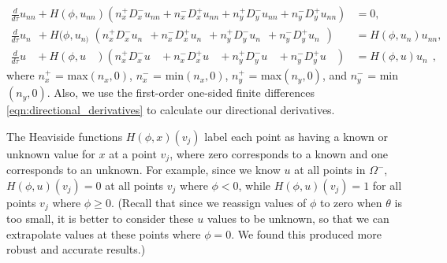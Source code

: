 \documentclass[oneside,12pt,final]{/Applications/TeX/packages/ucthesis-CA2012}
\begin{document}
\begin{mainmatter}
\begin{equation}  
\begin{aligned}
\frac{d}{d \tau}u_{nn} + H(\phi,u_{nn})(n_x^+D_x^-u_{nn} + n_x^-D_x^+u_{nn} + n_y^+D_y^-u_{nn} + n_y^-D_y^+u_{nn}) &= 0,\\
\frac{d}{d \tau}u_{n}\>\> + H(\phi,u_{n)\>\>}(n_x^+D_x^-u_{n}\>\> + n_x^-D_x^+u_{n}\>\> + n_y^+D_y^-u_{n}\>\> + n_y^-D_y^+u_{n}\>\>) &= H(\phi,u_n)u_{nn},\\
\frac{d}{d \tau}u\>\>\>\> + H(\phi,u\>\>\>\>)(n_x^+D_x^-u\>\>\>\> + n_x^-D_x^+u\>\>\>\> + n_y^+D_y^-u\>\>\>\> + n_y^-D_y^+u\>\>\>\>) &= H(\phi,u)u_n\>\>,
\end{aligned}
\end{equation}
where $n_x^+$ = max$(n_x,0)$, $n_x^-$ = min$(n_x,0)$, $n_y^+$ = max$(n_y,0)$, and $n_y^-$ = min$(n_y,0)$. Also, we use the first-order one-sided finite differences \eqref{eqn:directional_derivatives} to calculate our directional derivatives.

The Heaviside functions $H(\phi,x)(v_j)$ label each point as having a known or unknown value for $x$ at a point $v_j$, where zero corresponds to a known and one corresponds to an unknown. For example, since we know $u$ at all points in $\Omega^-$, $H(\phi, u)(v_j) = 0$ at all points $v_j$ where $\phi < 0$, while $H(\phi, u)(v_j) = 1$ for all points $v_j$ where $\phi \ge 0$. (Recall that since we reassign values of $\phi$ to zero when $\theta$ is too small, it is better to consider these $u$ values to be unknown, so that we can extrapolate values at these points where $\phi = 0$. We found this produced more robust and accurate results.)


\end{mainmatter}
\end{document}
